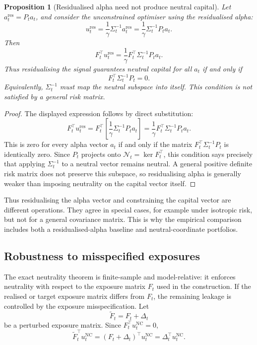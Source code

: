 \documentclass[11pt]{article}
\newtheorem{proposition}{Proposition}
\newcommand{\N}{\mathcal{N}}
\begin{document}
\begin{proposition}[Residualised alpha need not produce neutral capital]
\label{prop:res-alpha-not-neutral}
Let $a_t^{\mathrm{res}} = P_ta_t$, and consider the unconstrained optimiser using the residualised alpha:
\begin{equation}
        u_t^{\mathrm{res}}=\frac{1}{\gamma}\Sigma_t^{-1}a_t^{\mathrm{res}}
        =\frac{1}{\gamma}\Sigma_t^{-1}P_ta_t.
\end{equation}
Then
\begin{equation}
        F_t^\top u_t^{\mathrm{res}}=\frac{1}{\gamma}F_t^\top\Sigma_t^{-1}P_ta_t.
\end{equation}
Thus residualising the signal guarantees neutral capital for all $a_t$ if and only if
\begin{equation}
        F_t^\top\Sigma_t^{-1}P_t=0.
\end{equation}
Equivalently, $\Sigma_t^{-1}$ must map the neutral subspace into itself.  This condition is not satisfied
by a general risk matrix.
\end{proposition}

\begin{proof}
The displayed expression follows by direct substitution:
\[
        F_t^\top u_t^{\mathrm{res}}
        =F_t^\top\left[\frac{1}{\gamma}\Sigma_t^{-1}P_ta_t\right]
        =\frac{1}{\gamma}F_t^\top\Sigma_t^{-1}P_ta_t.
\]
This is zero for every alpha vector $a_t$ if and only if the matrix $F_t^\top\Sigma_t^{-1}P_t$ is
identically zero.  Since $P_t$ projects onto $\N_t=\ker F_t^\top$, this condition says precisely that
applying $\Sigma_t^{-1}$ to a neutral vector remains neutral.  A general positive definite risk matrix
does not preserve this subspace, so residualising alpha is generally weaker than imposing neutrality on
the capital vector itself.
\end{proof}

Thus residualising the alpha vector and constraining the capital vector are different operations. They
agree in special cases, for example under isotropic risk, but not for a general covariance matrix. This is
why the empirical comparison includes both a residualised-alpha baseline and neutral-coordinate portfolios.

\subsection{Robustness to misspecified exposures}

The exact neutrality theorem is finite-sample and model-relative: it enforces neutrality with respect to
the exposure matrix $F_t$ used in the construction.  If the realised or target exposure matrix differs from
$F_t$, the remaining leakage is controlled by the exposure misspecification.  Let
\[
        \widetilde F_t=F_t+\Delta_t
\]
be a perturbed exposure matrix.  Since $F_t^\top u_t^{\mathrm{NC}} = 0$,
\[
        \widetilde F_t^\top u_t^{\mathrm{NC}}
        =(F_t+\Delta_t)^\top u_t^{\mathrm{NC}}=\Delta_t^\top u_t^{\mathrm{NC}}.
\]
\end{document}
